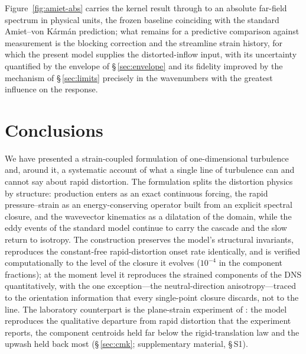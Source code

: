 \documentclass[lineno]{JFM-FLM_Au}
\begin{document}
Figure~\ref{fig:amiet-abs} carries the kernel result through to an
absolute far-field spectrum in physical units, the frozen baseline
coinciding with the standard Amiet--von K\'arm\'an prediction; what
remains for a predictive comparison against measurement is the
blocking correction and the streamline strain history, for which the
present model supplies the distorted-inflow input, with its
uncertainty quantified by the envelope of \S\,\ref{sec:envelope} and
its fidelity improved by the mechanism of \S\,\ref{sec:limits}
precisely in the wavenumbers with the greatest influence on the response.

\section{Conclusions}\label{sec:conclusions}

We have presented a strain-coupled formulation of one-dimensional
turbulence and, around it, a systematic account of what a single line of
turbulence can and cannot say about rapid distortion. The formulation
splits the distortion physics by structure: production enters as an
exact continuous forcing, the rapid pressure--strain as an
energy-conserving operator built from an explicit spectral closure, and
the wavevector kinematics as a dilatation of the domain, while the eddy
events of the standard model continue to carry the cascade and the slow
return to isotropy. The construction preserves the model's structural
invariants, reproduces the constant-free rapid-distortion onset rate
identically, and is verified computationally to the level of the closure
it evolves ($10^{-4}$ in the component fractions); at the moment level
it reproduces the strained components of the \citet{LeeReynolds1985}
DNS quantitatively, with the one exception---the neutral-direction
anisotropy---traced to the orientation information that every
single-point closure discards, not to the line. The laboratory
counterpart is the plane-strain experiment of
\citet{ChenMeneveauKatz2006}: the model reproduces the qualitative
departure from rapid distortion that the experiment reports, the
component centroids held far below the rigid-translation law and the
upwash held back most (\S\,\ref{sec:cmk}; supplementary material,
\S\,S1).
\end{document}
